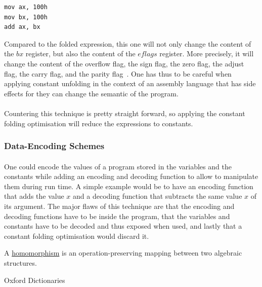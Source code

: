 \begin{lstlisting}[caption={Example of constant folding.}, label={lst:constant_unfolding}, frame=tlrb, language={[x86masm]Assembler}, otherkeywords={.CODE}]
mov ax, 100h
mov bx, 100h
add ax, bx
\end{lstlisting}

Compared to the folded expression, this one will not only change the content of the $bx$ register, but also the content of the $eflags$ register. More precisely, it will change the content of the overflow flag, the sign flag, the zero flag, the adjust flag, the carry flag, and the parity flag~\cite{guide2011intel}. One has thus to be careful when applying constant unfolding in the context of an assembly language that has side effects for they can change the semantic of the program. 

\paragraph{}
Countering this technique is pretty straight forward, so applying the constant folding optimisation will reduce the expressions to constants.

\subsubsection{Data-Encoding Schemes}
\paragraph{}
One could encode the values of a program stored in the variables and the constants while adding an encoding and decoding function to allow to manipulate them during run time. A simple example would be to have an encoding function that adds the value $x$ and a decoding function that subtracts the same value $x$ of its argument. The major flaws of this technique are that the encoding and decoding functions have to be inside the program, that the variables and constants have to be decoded and thus exposed when used, and lastly that a constant folding optimisation would discard it. 

\begin{framed}
	\begin{definition} 
		A \underline{homomorphism} is an operation-preserving mapping between two algebraic structures.
		\begin{flushright}
			\hfill{}{Oxford Dictionaries~\cite{od:obfuscation}}
		\end{flushright}
	\end{definition}
\end{framed}

